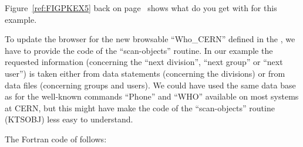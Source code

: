 Figure~\ref{ref:FIGPKEX5} back on page~\pageref{ref:FIGPKEX5} shows
what do you get with \KUIPMotif{} for this example.

To update the browser \OW{} for the new browsable ``Who\_CERN'' defined in the
\CDF{}, we have to provide the code of the ``scan-objects'' routine. In
our example the requested information (concerning the ``next division'',
``next group'' or ``next user'') is taken either from data statements 
(concerning the divisions) or from data files (concerning groups and users).
We could have used the same data base as for the well-known commands
``Phone'' and ``WHO'' available on most systems at CERN, but this might
have make the code of the ``scan-objects'' routine (KTSOBJ) less
easy to understand.

The Fortran code of  follows:

